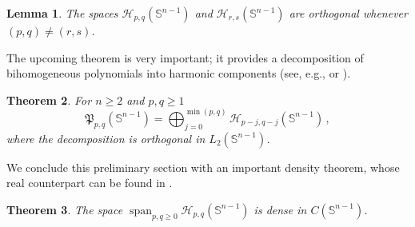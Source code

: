 \documentclass[12pt]{amsart}
\numberwithin{subsection}{section}
\newtheorem{theorem}{Theorem}[section]
\newtheorem{lemma}[theorem]{Lemma}
\theoremstyle{definition}
\theoremstyle{remark}
\DeclareMathOperator{\spa}{span}
\begin{document}
\begin{lemma} \label{ortogonales}
The spaces  $\mathcal{H}_{p,q}(\mathbb{S}^{n-1}) $ and  $\mathcal{H}_{r,s}(\mathbb{S}^{n-1}) $ are orthogonal whenever  $(p,q) \neq (r,s) $.
\end{lemma}


The upcoming theorem is very important; it provides a decomposition of bihomogeneous polynomials into harmonic components (see, e.g.,
\cite[Theorem 1]{bezubik2013spherical} or \cite{bezubik2008spherical,ikeda1968expansion,Koornwinder1972,vilenkin_shapiro_1963}).


\begin{theorem} \label{ludo13A-OKOK}
For $n \geq 2$ and  $p,q \geq 1 $
\begin{equation*} \label{ru5ru5}
\mathfrak{P}_{p,q} (\mathbb{S}^{n-1})=\bigoplus_{j=0}^{\min(p,q)}\mathcal{H}_{p-j, q-j}(\mathbb{S}^{n-1})\,,
\end{equation*}
where the  decomposition is   orthogonal in  $L_2(\mathbb{S}^{n-1}) $.
\end{theorem}


We conclude  this preliminary section with an important density theorem, whose real counterpart can be found in
\cite[Corollary 12.1.3]{rudin1980}.


\begin{theorem} \label{den-matrixA}
 The space $\spa_{p,q \geq 0}\mathcal H_{p,q}(\mathbb{S}^{n-1}) $ is dense in  $C(\mathbb{S}^{n-1}) $.
\end{theorem}





\end{document}
